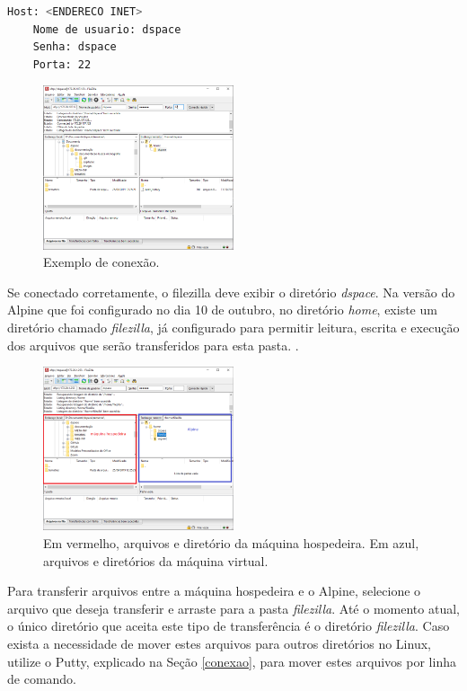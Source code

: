 \begin{lstlisting}[language=bash, label=lst2, caption=Campos do Filezilla para serem alterados]
    Host: <ENDERECO INET>
    Nome de usuario: dspace
    Senha: dspace
    Porta: 22
\end{lstlisting}

\begin{figure}[H]
    \centering
    \includegraphics[width=0.5\textwidth]{images/filezilla1.png}
    \caption{Exemplo de conexão.}
    \label{fig1}
\end{figure}

Se conectado corretamente, o filezilla deve exibir o diretório \textit{dspace}. Na versão do Alpine que foi configurado no dia 10 de outubro, no diretório \textit{home}, existe um diretório chamado \textit{filezilla}, já configurado para permitir leitura, escrita e execução dos arquivos que serão transferidos para esta pasta. .

\begin{figure}[H]
    \centering
    \includegraphics[width=0.5\textwidth]{images/filezilla2.png}
    \caption{Em vermelho, arquivos e diretório da máquina hospedeira. Em azul, arquivos e diretórios da máquina virtual.}
    \label{fig1}
\end{figure}

Para transferir arquivos entre a máquina hospedeira e o Alpine, selecione o arquivo que deseja transferir e arraste para a pasta \textit{filezilla}. Até o momento atual, o único diretório que aceita este tipo de transferência é o diretório \textit{filezilla}. Caso exista a necessidade de mover estes arquivos para outros diretórios no Linux, utilize o Putty, explicado na Seção \ref{conexao}, para mover estes arquivos por linha de comando.

